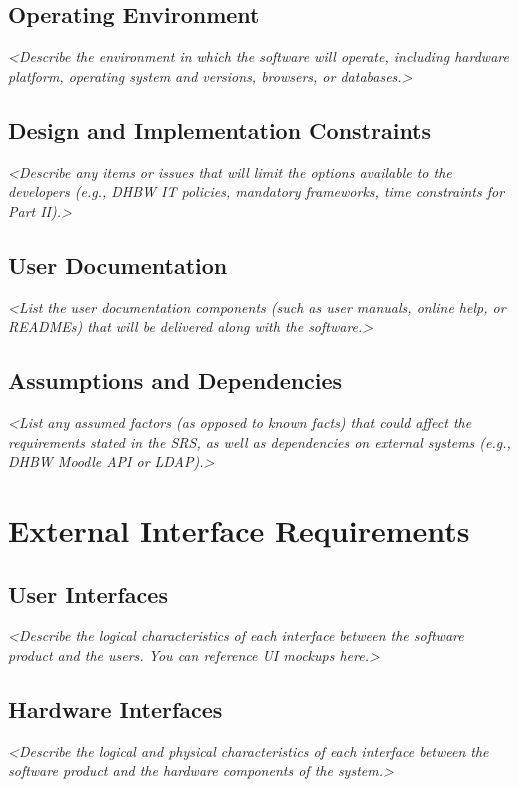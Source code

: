 \documentclass[11pt, a4paper]{article}
\newcommand{\guidance}[1]{\textit{\color{darkgray}<#1>}}
\begin{document}
\subsection{Operating Environment}
\guidance{Describe the environment in which the software will operate, including hardware platform, operating system and versions, browsers, or databases.}

\subsection{Design and Implementation Constraints}
\guidance{Describe any items or issues that will limit the options available to the developers (e.g., DHBW IT policies, mandatory frameworks, time constraints for Part II).}

\subsection{User Documentation}
\guidance{List the user documentation components (such as user manuals, online help, or READMEs) that will be delivered along with the software.}

\subsection{Assumptions and Dependencies}
\guidance{List any assumed factors (as opposed to known facts) that could affect the requirements stated in the SRS, as well as dependencies on external systems (e.g., DHBW Moodle API or LDAP).}

\section{External Interface Requirements}

\subsection{User Interfaces}
\guidance{Describe the logical characteristics of each interface between the software product and the users. You can reference UI mockups here.}

\subsection{Hardware Interfaces}
\guidance{Describe the logical and physical characteristics of each interface between the software product and the hardware components of the system.}
\end{document}
